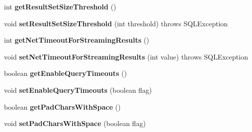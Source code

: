 \begin{DoxyCompactItemize}
\mbox{\label{interfacecom_1_1mysql_1_1jdbc_1_1_connection_properties_ac8881a88899566f5538f3c1cb43280e0}} 
int {\bfseries get\+Result\+Set\+Size\+Threshold} ()
\item 
\mbox{\label{interfacecom_1_1mysql_1_1jdbc_1_1_connection_properties_aad31fb0c074f03b92ab6d04dc6fcf6ee}} 
void {\bfseries set\+Result\+Set\+Size\+Threshold} (int threshold)  throws S\+Q\+L\+Exception
\item 
\mbox{\label{interfacecom_1_1mysql_1_1jdbc_1_1_connection_properties_aa704f068a0dd03a873e7f41bcd8806e0}} 
int {\bfseries get\+Net\+Timeout\+For\+Streaming\+Results} ()
\item 
\mbox{\label{interfacecom_1_1mysql_1_1jdbc_1_1_connection_properties_a6c346ee07d9db1a7c5d5a10ae5b0e4fb}} 
void {\bfseries set\+Net\+Timeout\+For\+Streaming\+Results} (int value)  throws S\+Q\+L\+Exception
\item 
\mbox{\label{interfacecom_1_1mysql_1_1jdbc_1_1_connection_properties_a714931cb665c557f74d10921572bc493}} 
boolean {\bfseries get\+Enable\+Query\+Timeouts} ()
\item 
\mbox{\label{interfacecom_1_1mysql_1_1jdbc_1_1_connection_properties_ac6095b516d7e6c5a57f26e928e6363b9}} 
void {\bfseries set\+Enable\+Query\+Timeouts} (boolean flag)
\item 
\mbox{\label{interfacecom_1_1mysql_1_1jdbc_1_1_connection_properties_ab322f91642f1ac37d7d080cad6ed0871}} 
boolean {\bfseries get\+Pad\+Chars\+With\+Space} ()
\item 
\mbox{\label{interfacecom_1_1mysql_1_1jdbc_1_1_connection_properties_a920c8a55fd573ef9af82e8d9162079d7}} 
void {\bfseries set\+Pad\+Chars\+With\+Space} (boolean flag)
\item 
\mbox{\label{interfacecom_1_1mysql_1_1jdbc_1_1_connection_properties_a5a3ba0a48a85fcc6dc3d9f11010334bb}} 

\end{DoxyCompactItemize}
